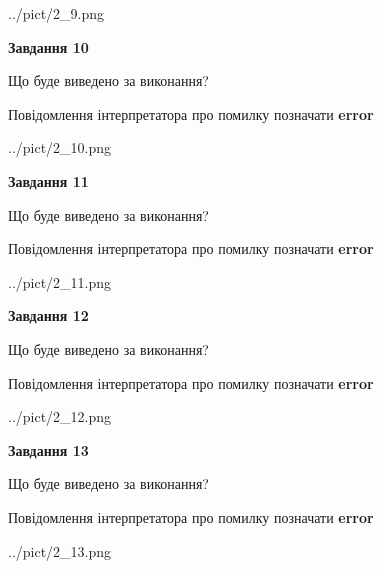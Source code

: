 \documentclass[11pt, ukrainian]{article}
\begin{document}
{\begin {large}
\begin{center}
	{../pict/2_9.png}
\end{center}
\newpage

{\begin {center}\textbf{Завдання 10}\end {center}}\par
Що буде виведено за виконання? \par
Повідомлення інтерпретатора про помилку позначати \textbf{error}

\begin{center}
	{../pict/2_10.png}
\end{center}
\newpage

{\begin {center}\textbf{Завдання 11}\end {center}}\par
Що буде виведено за виконання? \par
Повідомлення інтерпретатора про помилку позначати \textbf{error}

\begin{center}
	{../pict/2_11.png}
\end{center}
\newpage

{\begin {center}\textbf{Завдання 12}\end {center}}\par
Що буде виведено за виконання? \par
Повідомлення інтерпретатора про помилку позначати \textbf{error}

\begin{center}
	{../pict/2_12.png}
\end{center}
\newpage

{\begin {center}\textbf{Завдання 13}\end {center}}\par
Що буде виведено за виконання? \par
Повідомлення інтерпретатора про помилку позначати \textbf{error}

\begin{center}
	{../pict/2_13.png}
\end{center}
\newpage


\end{large}}
\end{document}
